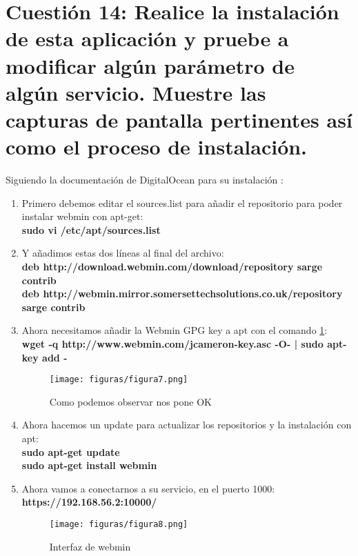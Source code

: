 
\section{Cuestión 14: Realice la instalación de esta aplicación y pruebe a modificar algún parámetro de algún servicio. Muestre las capturas de pantalla pertinentes así como el proceso de instalación.}

Siguiendo la documentación de DigitalOcean para su instalación \cite{webmin-digital}:
\begin{enumerate}
	\item Primero debemos editar el sources.list para añadir el repositorio para poder instalar webmin con apt-get:\\
	\textbf{sudo vi /etc/apt/sources.list}
	\item Y añadimos estas dos líneas al final del archivo:\\
	\textbf{deb http://download.webmin.com/download/repository sarge contrib}\\
	\textbf{deb http://webmin.mirror.somersettechsolutions.co.uk/repository sarge contrib}
	\item Ahora necesitamos añadir la Webmin GPG key a apt con el comando \ref{figura7}:\\
	\textbf{wget -q http://www.webmin.com/jcameron-key.asc -O- | sudo apt-key add -}
	\begin{figure}[H] %
		\centering
		\texttt{[image: figuras/figura7.png]}  %
		\label{figura7}
		
		\caption{Como podemos observar nos pone OK} 
	\end{figure}
	\item Ahora hacemos un update para actualizar los repositorios y la instalación con apt:\\
	\textbf{sudo apt-get update}\\
	\textbf{sudo apt-get install webmin}
	\item Ahora vamos a conectarnos a su servicio, en el puerto 1000:\\
	\textbf{https://192.168.56.2:10000/}
	\begin{figure}[H] %
		\centering
		\texttt{[image: figuras/figura8.png]}  %
		\label{figura8}
		
		\caption{Interfaz de webmin} 
	\end{figure}
	
\end{enumerate}

